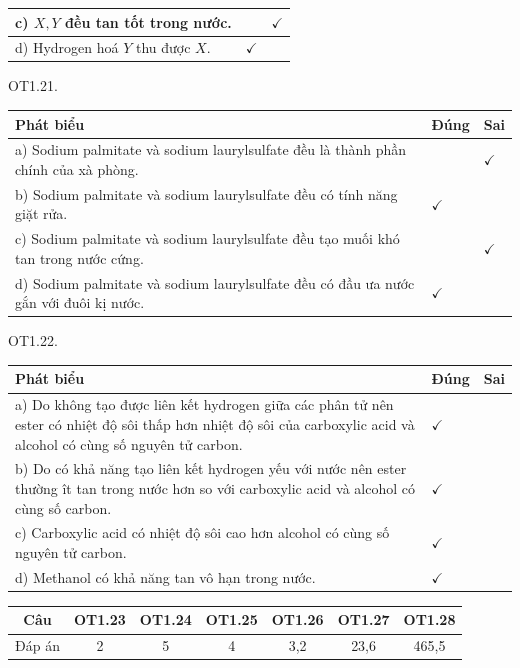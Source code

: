 \documentclass[10pt]{article}
\begin{document}
\begin{center}
\begin{tabular}{|l|c|c|}
\hline
c) $X, Y$ đều tan tốt trong nước. &  & $\checkmark$ \\
\hline
d) Hydrogen hoá $Y$ thu được $X$. & $\checkmark$ &  \\
\hline
\end{tabular}
\end{center}

OT1.21.

\begin{center}
\begin{tabular}{|l|l|l|}
\hline
Phát biểu & Đúng & Sai \\
\hline
a) Sodium palmitate và sodium laurylsulfate đều là thành phần chính của xà phòng. &  & $\checkmark$ \\
\hline
b) Sodium palmitate và sodium laurylsulfate đều có tính năng giặt rửa. & $\checkmark$ &  \\
\hline
c) Sodium palmitate và sodium laurylsulfate đều tạo muối khó tan trong nước cứng. &  & $\checkmark$ \\
\hline
d) Sodium palmitate và sodium laurylsulfate đều có đầu ưa nước gắn với đuôi kị nước. & $\checkmark$ &  \\
\hline
\end{tabular}
\end{center}

OT1.22.

\begin{center}
\begin{tabular}{|l|l|l|}
\hline
Phát biểu & Đúng & Sai \\
\hline
a) Do không tạo được liên kết hydrogen giữa các phân tử nên ester có nhiệt độ sôi thấp hơn nhiệt độ sôi của carboxylic acid và alcohol có cùng số nguyên tử carbon. & $\checkmark$ &  \\
\hline
b) Do có khả năng tạo liên kết hydrogen yếu với nước nên ester thường ît tan trong nước hơn so với carboxylic acid và alcohol có cùng số carbon. & $\checkmark$ &  \\
\hline
c) Carboxylic acid có nhiệt độ sôi cao hơn alcohol có cùng số nguyên tử carbon. & $\checkmark$ &  \\
\hline
d) Methanol có khả năng tan vô hạn trong nước. & $\checkmark$ &  \\
\hline
\end{tabular}
\end{center}

\begin{center}
\begin{tabular}{|c|c|c|c|c|c|c|}
\hline
Câu & OT1.23 & OT1.24 & OT1.25 & OT1.26 & OT1.27 & OT1.28 \\
\hline
Đáp án & 2 & 5 & 4 & 3,2 & 23,6 & 465,5 \\
\hline
\end{tabular}
\end{center}
\end{document}
